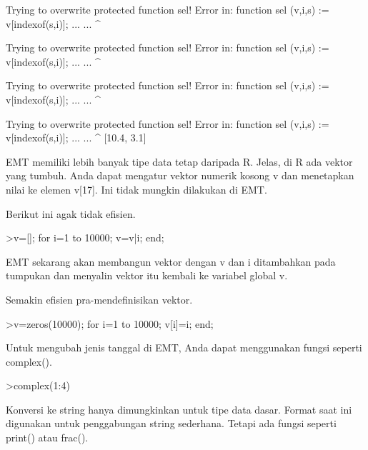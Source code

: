 \documentclass[a4paper,10pt]{article}
\begin{document}
\begin{eulernotebook}
\begin{eulercomment}
\begin{eulercomment}
\begin{eulercomment}
\begin{eulercomment}
\begin{euleroutput}
  Trying to overwrite protected function sel!
  Error in:
  function sel (v,i,s) := v[indexof(s,i)]; ... ...
               ^
  
  Trying to overwrite protected function sel!
  Error in:
  function sel (v,i,s) := v[indexof(s,i)]; ... ...
               ^
  
  Trying to overwrite protected function sel!
  Error in:
  function sel (v,i,s) := v[indexof(s,i)]; ... ...
               ^
  
  Trying to overwrite protected function sel!
  Error in:
  function sel (v,i,s) := v[indexof(s,i)]; ... ...
               ^
  [10.4,  3.1]
\end{euleroutput}
\begin{eulercomment}
EMT memiliki lebih banyak tipe data tetap daripada R. Jelas, di R ada
vektor yang tumbuh. Anda dapat mengatur vektor numerik kosong v dan
menetapkan nilai ke elemen v[17]. Ini tidak mungkin dilakukan di EMT.

Berikut ini agak tidak efisien.
\end{eulercomment}
\begin{eulerprompt}
>v=[]; for i=1 to 10000; v=v|i; end;
\end{eulerprompt}
\begin{eulercomment}
EMT sekarang akan membangun vektor dengan v dan i ditambahkan pada
tumpukan dan menyalin vektor itu kembali ke variabel global v.

Semakin efisien pra-mendefinisikan vektor.
\end{eulercomment}
\begin{eulerprompt}
>v=zeros(10000); for i=1 to 10000; v[i]=i; end;
\end{eulerprompt}
\begin{eulercomment}
Untuk mengubah jenis tanggal di EMT, Anda dapat menggunakan fungsi
seperti complex().
\end{eulercomment}
\begin{eulerprompt}
>complex(1:4)
\end{eulerprompt}
\begin{euleroutput}
  [ 1+0i ,  2+0i ,  3+0i ,  4+0i  ]
\end{euleroutput}
\begin{eulercomment}
Konversi ke string hanya dimungkinkan untuk tipe data dasar. Format
saat ini digunakan untuk penggabungan string sederhana. Tetapi ada
fungsi seperti print() atau frac().


\end{eulercomment}
\end{eulercomment}
\end{eulercomment}
\end{eulercomment}
\end{eulercomment}
\end{eulernotebook}
\end{document}
